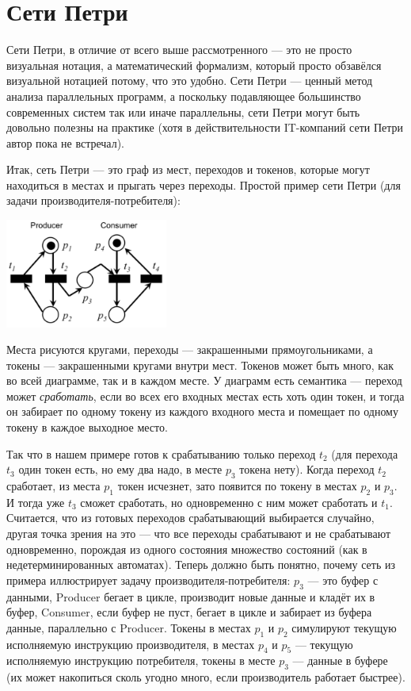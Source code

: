 \documentclass[a5paper]{article}
\begin{document}
\section{Сети Петри}

Сети Петри, в отличие от всего выше рассмотренного --- это не просто визуальная нотация, а математический формализм, который просто обзавёлся визуальной нотацией потому, что это удобно. Сети Петри --- ценный метод анализа параллельных программ, а поскольку подавляющее большинство современных систем так или иначе параллельны, сети Петри могут быть довольно полезны на практике (хотя в действительности IT-компаний сети Петри автор пока не встречал).

Итак, сеть Петри --- это граф из мест, переходов и токенов, которые могут находиться в местах и прыгать через переходы. Простой пример сети Петри (для задачи производителя-потребителя):

\begin{center}
    \includegraphics[width=0.4\textwidth]{petri.png}
\end{center}

Места рисуются кругами, переходы --- закрашенными прямоугольниками, а токены --- закрашенными кругами внутри мест. Токенов может быть много, как во всей диаграмме, так и в каждом месте. У диаграмм есть семантика --- переход может \textit{сработать}, если во всех его входных местах есть хоть один токен, и тогда он забирает по одному токену из каждого входного места и помещает по одному токену в каждое выходное место. 

Так что в нашем примере готов к срабатыванию только переход $t_2$ (для перехода $t_3$ один токен есть, но ему два надо, в месте $p_3$ токена нету). Когда переход $t_2$ сработает, из места $p_1$ токен исчезнет, зато появится по токену в местах $p_2$ и $p_3$. И тогда уже $t_3$ сможет сработать, но одновременно с ним может сработать и $t_1$. Считается, что из готовых переходов срабатывающий выбирается случайно, другая точка зрения на это --- что все переходы срабатывают и не срабатывают одновременно, порождая из одного состояния множество состояний (как в недетерминированных автоматах). Теперь должно быть понятно, почему сеть из примера иллюстрирует задачу производителя-потребителя: $p_3$ --- это буфер с данными, Producer бегает в цикле, производит новые данные и кладёт их в буфер, Consumer, если буфер не пуст, бегает в цикле и забирает из буфера данные, параллельно с Producer. Токены в местах $p_1$ и $p_2$ симулируют текущую исполняемую инструкцию производителя, в местах $p_4$ и $p_5$ --- текущую исполняемую инструкцию потребителя, токены в месте $p_3$ --- данные в буфере (их может накопиться сколь угодно много, если производитель работает быстрее).
\end{document}
